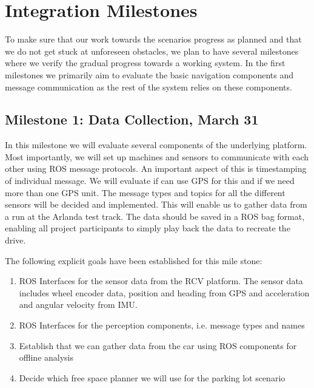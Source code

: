 \documentclass[11pt,a4paper]{article}
\begin{document}
\section{Integration Milestones}

To make sure that our work towards the scenarios progress as planned and that
we do not get stuck at unforeseen obstacles, we plan to have several milestones
where we verify the gradual progress towards a working system.
In the first milestones we primarily aim to evaluate the basic navigation components
and message communication as the rest of the system relies on these components.

\subsection{Milestone 1: Data Collection, March 31}
\label{milestone1}

In this milestone we will evaluate several components of the underlying platform.
Most importantly, we will set up machines and sensors to communicate with each
other using ROS message protocols. An important aspect of this is timestamping
of individual message. We will evaluate if can use GPS for this and if we need
more than one GPS unit. The message types and topics for all the different sensors
will be decided and implemented. This will enable us to gather data from a run
at the Arlanda test track. The data should be saved in a ROS bag format, enabling
all project participants to simply play back the data to recreate the drive.

The following explicit goals have been established for this mile stone:
\begin{enumerate}
\item ROS Interfaces for the sensor data from the RCV platform. The sensor data includes wheel encoder data, position and heading from GPS and acceleration and angular velocity from IMU.
\item ROS Interfaces for the perception components, i.e. message types and names
\item Establish that we can gather data from the car using ROS components for offline analysis
\item Decide which free space planner we will use for the parking lot scenario
\end{enumerate}
\end{document}
